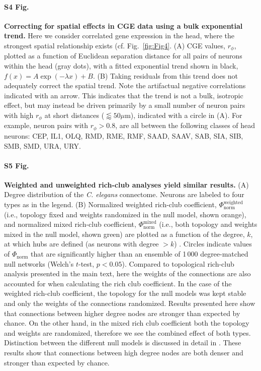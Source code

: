 \documentclass[10pt,letterpaper]{article}
\begin{document}
\paragraph*{S4 Fig.}
\label{S4_Fig}
{\bf Correcting for spatial effects in CGE data using a bulk exponential trend.}
  Here we consider correlated gene expression in the head, where the strongest spatial relationship exists (cf. Fig.~\ref{fig:Fig4}. (A) CGE values, $r_\phi$, plotted as a function of Euclidean separation distance for all pairs of neurons within the head (gray dots), with a fitted exponential trend shown in black, $f(x) = A\exp(-\lambda x) + B$.
(B) Taking residuals from this trend does not adequately correct the spatial trend.
    Note the artifactual negative correlations indicated with an arrow.
    This indicates that the trend is not a bulk, isotropic effect, but may instead be driven primarily by a small number of neuron pairs with high $r_\phi$ at short distances ($\lessapprox 50\mu$m), indicated with a circle in (A).
For example, neuron pairs with $r_\phi > 0.8$, are all between the following classes of head neurons: CEP, IL1, OLQ, RMD, RME, RMF, SAAD, SAAV, SAB, SIA, SIB, SMB, SMD, URA, URY.

\paragraph*{S5 Fig.}
\label{S5_Fig}
{\bf Weighted and unweighted rich-club analyses yield similar results.}
   (A) Degree distribution of the \emph{C. elegans} connectome.
    Neurons are labeled to four types as in the legend.
    (B)
    Normalized weighted rich-club coefficient, $\Phi_\mathrm{norm}^\mathrm{weighted}$ (i.e., topology fixed and weights randomized in the null model, shown orange), and
    normalized mixed rich-club coefficient, $\Phi_\mathrm{norm}^\mathrm{mixed}$ (i.e., both topology and weights mixed in the null model, shown green) are plotted as a function of the degree, $k$, at which hubs are defined (as neurons with degree $>k$) \cite{Alstott2014}.
    Circles indicate values of $\Phi_\mathrm{norm}$ that are significantly higher than an ensemble of 1\,000 degree-matched null networks (Welch's $t$-test, $p < 0.05$).
    Compared to topological rich-club analysis presented in the main text, here the weights of the connections are also accounted for when calculating the rich club coefficient.
    In the case of the weighted rich-club coefficient, the topology for the null models was kept stable and only the weights of the connections randomized. Results presented here show that connections between higher degree nodes are stronger than expected by chance.
    On the other hand, in the mixed rich club coefficient both the topology and weights are randomized, therefore we see the combined effect of both types.
    Distinction between the different null models is discussed in detail in \cite{Alstott2014}.
    These results show that connections between high degree nodes are both denser and stronger than expected by chance.
\end{document}
